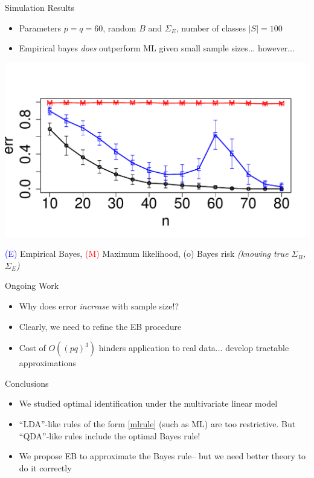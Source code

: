 \documentclass[final]{beamer}
\newlength{\onecolwid}
\begin{document}
\begin{frame}[t]
\begin{columns}[t]
\begin{column}{\onecolwid}
\begin{block}{Simulation Results}
\begin{itemize}
\item Parameters $p = q = 60$, random $B$ and $\Sigma_E$, number of classes $|S| = 100$
\item Empirical bayes \emph{does} outperform ML given small sample sizes... however...
\end{itemize}
\begin{center}
\includegraphics[scale = 1.3, trim = 0in 0in 0in 0.5in]{simulation1.pdf}
\end{center}
\small{
 \textcolor{blue}{(E)} Empirical Bayes,  \textcolor{red}{(M)} Maximum likelihood,
(o) Bayes risk \emph{(knowing true $\Sigma_B$, $\Sigma_E$)}}
\end{block}

\begin{block}{Ongoing Work}
\begin{itemize}
\item Why does error \emph{increase} with sample size!?
\item Clearly, we need to refine the EB procedure
\item Cost of $O((pq)^3)$ hinders application to real data... develop tractable approximations
\end{itemize}
\end{block}


\begin{block}{Conclusions}
\begin{itemize}
\item We studied optimal identification under the multivariate linear model
\item ``LDA''-like rules of the form \eqref{mlrule} (such as ML) are too restrictive.
But ``QDA''-like rules include the optimal Bayes rule!
\item We propose EB to approximate the Bayes rule-- but we need better theory to do it correctly
\end{itemize}
\end{block}


\end{column}
\end{columns}
\end{frame}
\end{document}
